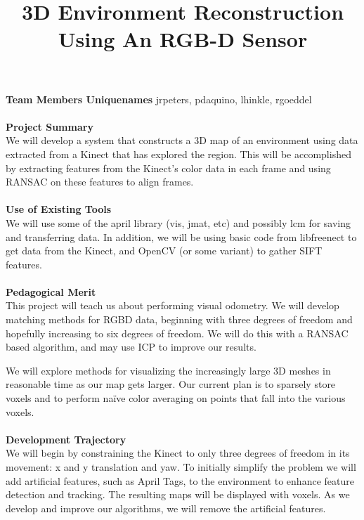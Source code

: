 \documentclass[12pt]{article}
\begin{document}
\title{3D Environment Reconstruction Using An RGB-D Sensor}
\maketitle

{\bf Team Members Uniquenames}
jrpeters, pdaquino, lhinkle, rgoeddel
\\ \\
{\bf Project Summary }\\
We will develop a system that constructs a 3D map of an environment using data extracted
from a Kinect that has explored the region.  This will be accomplished by extracting features
from the Kinect's color data in each frame and using RANSAC on these features to align
frames.
\\ \\
{\bf Use of Existing Tools }\\
We will use some of the april library (vis, jmat, etc) and possibly lcm for saving and
transferring data.  In addition, we will be using basic code from libfreenect to get data from
 the Kinect, and OpenCV (or some variant) to gather SIFT features.
\\ \\
{\bf Pedagogical Merit }\\
This project will teach us about performing visual odometry.  We will develop matching
methods for RGBD data, beginning with three degrees of freedom and hopefully increasing
to six degrees of freedom.  We will do this with a RANSAC based algorithm, and may use ICP
to improve our results.

We will explore methods for visualizing the increasingly large 3D meshes in reasonable time
as our map gets larger. Our current plan is to sparsely store voxels and to perform na\"{i}ve
color averaging on points that fall into the various voxels.
\\ \\
{\bf Development Trajectory }\\
We will begin by constraining the Kinect to only three degrees of freedom in its movement: x
and y translation and yaw.  To initially simplify the problem we will add artificial features, such
as April Tags, to the environment to enhance feature detection and tracking.  The resulting
maps will be displayed with voxels.  As we develop and improve our algorithms, we will remove
the artificial features.
\end{document}
